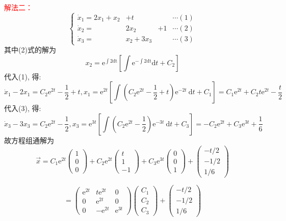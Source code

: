 \textcolor{red}{解法二：}
$$\left\{\begin{array}{llrl}
\dot{x}_{1}=2 x_{1}+x_{2} & +t & & \cdots(1)  \\
\dot{x}_{2}= & 2 x_{2} & +1  & \cdots(2) \\
\dot{x}_{3}= & x_{2}+3 x_{3} &  & \cdots(3)
\end{array} \right.$$
其中(2)式的解为 $$x_{2}=\mathrm{e}^{\int 2 \mathrm{dt}}\left[\int \mathrm{e}^{-\int 2 \mathrm{dt}} \mathrm{d} t+C_{2}\right]$$
代入(1), 得:  $$\dot{x}_{1}-2 x_{1}=C_{2} \mathrm{e}^{2 t}-\frac{1}{2}+t, x_{1}=\mathrm{e}^{2 t}\left[\int\left(C_{2} \mathrm{e}^{2 t}-\frac{1}{2}+t\right) \mathrm{e}^{-2 t} \mathrm{~d} t+C_{1}\right]=C_{1} \mathrm{e}^{2 t}+C_{2} t \mathrm{e}^{2 t}-\frac{t}{2} $$
代入(3), 得:  $$\dot{x}_{3}-3 x_{3}=C_{2} \mathrm{e}^{2 t}-\frac{1}{2}, x_{3}=\mathrm{e}^{3 t}\left[\int\left(C_{2} \mathrm{e}^{2 t}-\frac{1}{2}\right) \mathrm{e}^{-3 t} \mathrm{~d} t+C_{3}\right]=-C_{2} \mathrm{e}^{2 t}+C_{3} \mathrm{e}^{3 t}+\frac{1}{6} $$
故方程组通解为  $$\vec{x}=C_{1} \mathrm{e}^{2 t}\left(\begin{array}{l}1 \\ 0 \\ 0\end{array}\right)+C_{2} \mathrm{e}^{2 t}\left(\begin{array}{l}t \\ 1 \\ -1\end{array}\right)+C_{3} \mathrm{e}^{3 t}\left(\begin{array}{l}0 \\ 0 \\ 1\end{array}\right)+\left(\begin{array}{c}-t / 2 \\ -1 / 2 \\ 1 / 6\end{array}\right) $$


$$=\left(\begin{array}{ccc}
\mathrm{e}^{2 t} & t \mathrm{e}^{2 t} & 0 \\
0 & \mathrm{e}^{2 t} & 0 \\
0 & -\mathrm{e}^{2 t} & \mathrm{e}^{3 t}
\end{array}\right)\left(\begin{array}{l}
C_{1} \\
C_{2} \\
C_{3}
\end{array}\right)+\left(\begin{array}{r}
-t / 2 \\
-1 / 2 \\
1 / 6
\end{array}\right)$$



